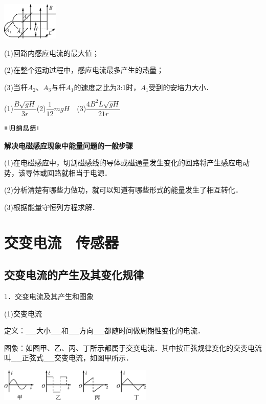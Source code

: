 \documentclass[cn,10.5pt,chinese,mac,chinesefont=founder]{elegantbook}
\begin{document}
\begin{center}\includegraphics[width=1.04722in,height=0.69792in]{media/image431.png}\end{center}

(1)回路内感应电流的最大值；

(2)在整个运动过程中，感应电流最多产生的热量；

(3)当杆$A_2$、$A_3$与杆$A_1$的速度之比为3:1时，$A_1$受到的安培力大小．
\begin{solution}
	(1)$\dfrac{B \sqrt{g H}}{3 r}$(2)$\dfrac{1}{12} m g H$　(3)$\dfrac{4 B^{2} L \sqrt{g H}}{21 r}$
\end{solution}

\begin{center}\includegraphics[width=0.70764in,height=0.12292in]{media/image13.png}\end{center}
\begin{center}
	\textbf{解决电磁感应现象中能量问题的一般步骤}
\end{center}

(1)在电磁感应中，切割磁感线的导体或磁通量发生变化的回路将产生感应电动势，该导体或回路就相当于电源．

(2)分析清楚有哪些力做功，就可以知道有哪些形式的能量发生了相互转化．

(3)根据能量守恒列方程求解．

\chapter{交变电流　传感器}
\section{交变电流的产生及其变化规律}

1．交变电流及其产生和图象

(1)交变电流

定义：\_\_大小\_\_和\_\_方向\_\_都随时间做周期性变化的电流．

图象：如图甲、乙、丙、丁所示都属于交变电流．其中按正弦规律变化的交变电流叫\_\_正弦式\_\_交变电流，如图甲所示．

\begin{center}\includegraphics[width=2.89653in,height=0.60347in]{media/image436.png}\end{center}
\end{document}
